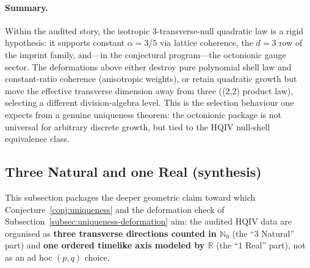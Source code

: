\documentclass[11pt]{amsart}
\begin{document}
\paragraph{Summary.}
Within the audited story, the isotropic \(3\)-transverse-null quadratic law is a rigid hypothesis: it supports constant \(\alpha=3/5\) via lattice coherence, the \(d=3\) row of the imprint family, and---in the conjectural program---the octonionic gauge sector. The deformations above either destroy pure polynomial shell law and constant-ratio coherence (anisotropic weights), or retain quadratic growth but move the effective transverse dimension away from three ((2,2) product law), selecting a different division-algebra level. This is the selection behaviour one expects from a genuine uniqueness theorem: the octonionic package is not universal for arbitrary discrete growth, but tied to the HQIV null-shell equivalence class.

\subsection{Three Natural and one Real (synthesis)}
\label{subsec:three-natural-one-real}

This subsection packages the deeper geometric claim toward which Conjecture~\ref{conj:uniqueness} and the deformation check of Subsection~\ref{subsec:uniqueness-deformation} aim: the audited HQIV data are organised as \textbf{three transverse directions counted in \(\mathbb{N}_0\)} (the ``\(3\) Natural'' part) and \textbf{one ordered timelike axis modeled by \(\mathbb{R}\)} (the ``\(1\) Real'' part), not as an ad hoc \((p,q)\) choice.
\end{document}
